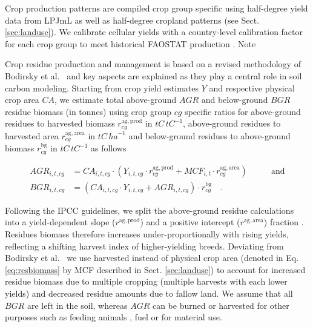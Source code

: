 \documentclass[gc, manuscript]{copernicus}
\begin{document}
Crop production patterns are compiled crop group specific using half-degree yield data from LPJmL \citep{schaphoff_lpjml4_2018} as well as half-degree cropland patterns (see Sect. \ref{sec:landuse}). We calibrate cellular yields with a country-level calibration factor for each crop group to meet historical FAOSTAT production \citep{faostat_faostat_2016}. Note

Crop residue production and management is based on a revised methodology of Bodirsky et al.~\citeyearpar{bodirsky_n2o_2012} and key aspects are explained as they play a central role in soil carbon modeling. Starting from crop yield estimates \(Y\) and respective physical crop area \(CA\), we estimate total above-ground \(AGR\) and below-ground \(BGR\) residue biomass (in tonnes) using crop group \(cg\) specific ratios for above-ground residues to harvested biomass \(r^{\mathrm{ag,prod}}_{cg}\) in \(\unit{tC\,\unit{tC}^{-1}}\), above-ground residues to harvested area \(r^{\mathrm{ag,area}}_{cg}\) in \(\unit{tC\,\unit{ha}^{-1}}\) and below-ground residues to above-ground biomass \(r^{\mathrm{bg}}_{cg}\) in \(\unit{tC\,\unit{tC}^{-1}}\) as follows

\begin{equation}
\begin{aligned}
AGR_{i,t,cg} & = CA_{i,t,cg} \cdot \left( Y_{i,t,cg} \cdot  r^{\mathrm{ag,prod}}_{cg} + MCF_{i,t} \cdot r^{\mathrm{ag,area}}_{cg} \right)
\qquad & \textrm{and} \\
BGR_{i,t,cg} & = (CA_{i,t,cg} \cdot Y_{i,t,cg} + AGR_{i,t,cg}) \cdot r^{\mathrm{bg}}_{cg} \quad.
\label{eq:resbiomass}
\end{aligned}
\end{equation}

Following the IPCC guidelines, we split the above-ground residue calculations into a yield-dependent slope (\(r^{\mathrm{ag,prod}}\)) and a positive intercept (\(r^{\mathrm{ag,area}}\)) fraction \citep{hergoualch_n2o_in_ipcc_2019}. Residues biomass therefore increases under-proportionally with rising yields, reflecting a shifting harvest index of higher-yielding breeds.
Deviating from Bodirsky et al.~\citeyearpar{bodirsky_n2o_2012} we use harvested instead of physical crop area (denoted in Eq. \eqref{eq:resbiomass} by MCF described in Sect. \ref{sec:landuse}) to account for increased residue biomass due to multiple cropping (multiple harvests with each lower yields) and decreased residue amounts due to fallow land. We assume that all \(BGR\) are left in the soil, whereas \(AGR\) can be burned or harvested for other purposes such as feeding animals \citep{weindl_livestock_2017}, fuel or for material use.
\end{document}
